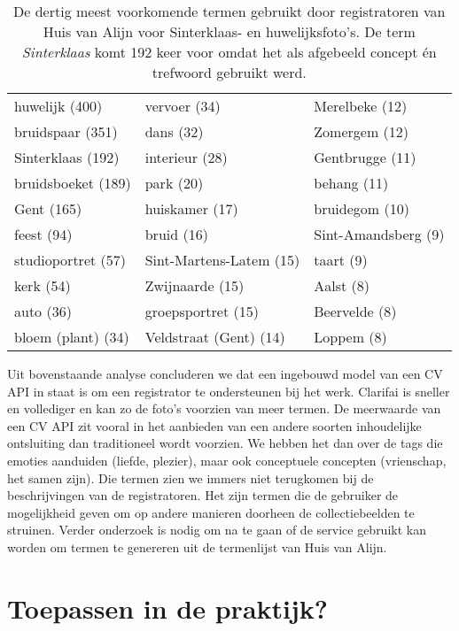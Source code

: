 \begin{table}
	\centering
	\begin{tabular}{*{3}{l}}
		huwelijk (400) & vervoer (34) & Merelbeke (12) \\
		bruidspaar (351) & dans (32) & Zomergem (12) \\
		Sinterklaas (192) & interieur (28) & Gentbrugge (11) \\
		bruidsboeket (189) & park (20) & behang (11) \\
		Gent (165) & huiskamer (17) & bruidegom (10) \\
		feest (94) & bruid (16) & Sint-Amandsberg (9) \\
		studioportret (57) & Sint-Martens-Latem (15) & taart (9) \\
		kerk (54) & Zwijnaarde (15) & Aalst (8) \\
		auto (36) & groepsportret (15) & Beervelde (8) \\
		bloem (plant) (34) & Veldstraat (Gent) (14) & Loppem (8) \\
	\end{tabular}
	\caption[Dertig meest voorkomende termen gebruikt door registratoren van Huis van Alijn]{De dertig meest voorkomende termen gebruikt door registratoren van Huis van Alijn voor Sinterklaas- en huwelijksfoto's. De term \textit{Sinterklaas} komt 192 keer voor omdat het als afgebeeld concept én trefwoord gebruikt werd.}
	\label{tab:30-termen-HvA}
\end{table}

Uit bovenstaande analyse concluderen we dat een ingebouwd model van een CV API in staat is om een registrator te ondersteunen bij het werk. Clarifai is sneller en vollediger en kan zo de foto's voorzien van meer termen. De meerwaarde van een CV API zit vooral in het aanbieden van een andere soorten inhoudelijke ontsluiting dan traditioneel wordt voorzien. We hebben het dan over de tags die emoties aanduiden (liefde, plezier), maar ook conceptuele concepten (vrienschap, het samen zijn). Die termen zien we immers niet terugkomen bij de beschrijvingen van de registratoren. Het zijn termen die de gebruiker de mogelijkheid geven om op andere manieren doorheen de collectiebeelden te struinen. Verder onderzoek is nodig om na te gaan of de service gebruikt kan worden om termen te genereren uit de termenlijst van Huis van Alijn. 

\section{Toepassen in de praktijk?}
\label{sec:ingebouwd-toepassen-praktijk}

